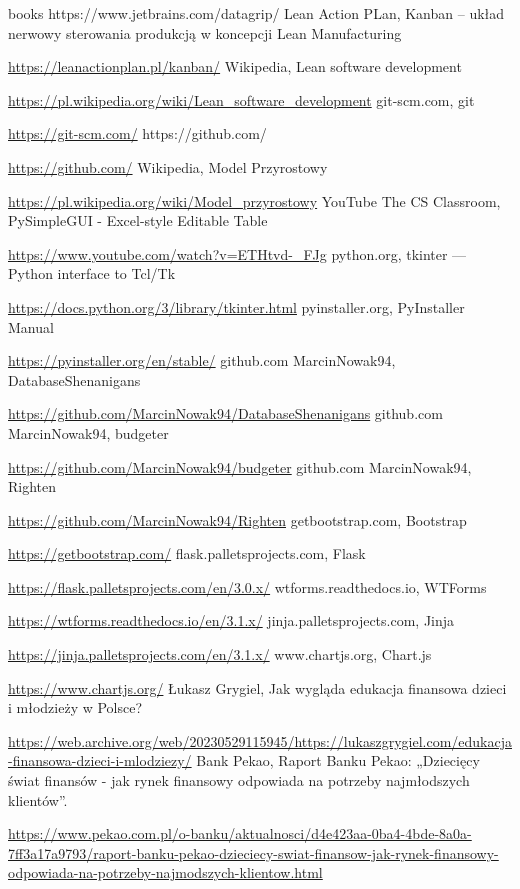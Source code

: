 \documentclass[a4paper,10pt, twoside]{report}
\begin{document}
\begin{thebibliography} {books}
{    https://www.jetbrains.com/datagrip/}
 Lean Action PLan, Kanban – układ nerwowy sterowania produkcją w koncepcji Lean Manufacturing \raggedright\url{
    https://leanactionplan.pl/kanban/}
 Wikipedia, Lean software development \raggedright\url{
    https://pl.wikipedia.org/wiki/Lean_software_development}
 git-scm.com, git \raggedright\url{
    https://git-scm.com/}
 https://github.com/ \raggedright\url{
    https://github.com/}
 Wikipedia, Model Przyrostowy \raggedright\url{
    https://pl.wikipedia.org/wiki/Model_przyrostowy}
 YouTube The CS Classroom, PySimpleGUI - Excel-style Editable Table \raggedright\url{
    https://www.youtube.com/watch?v=ETHtvd-_FJg}
 python.org, tkinter — Python interface to Tcl/Tk \raggedright\url{
    https://docs.python.org/3/library/tkinter.html}
 pyinstaller.org, PyInstaller Manual \raggedright\url{
    https://pyinstaller.org/en/stable/}
 github.com MarcinNowak94, DatabaseShenanigans \raggedright\url{
    https://github.com/MarcinNowak94/DatabaseShenanigans}
 github.com MarcinNowak94, budgeter \raggedright\url{
    https://github.com/MarcinNowak94/budgeter}
 github.com MarcinNowak94, Righten \raggedright\url{
    https://github.com/MarcinNowak94/Righten}
 getbootstrap.com, Bootstrap \raggedright\url{
    https://getbootstrap.com/}
 flask.palletsprojects.com, Flask \raggedright\url{
    https://flask.palletsprojects.com/en/3.0.x/}
 wtforms.readthedocs.io, WTForms \raggedright\url{
    https://wtforms.readthedocs.io/en/3.1.x/}
 jinja.palletsprojects.com, Jinja \raggedright\url{
    https://jinja.palletsprojects.com/en/3.1.x/}
 www.chartjs.org, Chart.js \raggedright\url{
    https://www.chartjs.org/}
 Łukasz Grygiel, Jak wygląda edukacja finansowa dzieci i młodzieży w Polsce? \raggedright\url{
        https://web.archive.org/web/20230529115945/https://lukaszgrygiel.com/edukacja-finansowa-dzieci-i-mlodziezy/}
 Bank Pekao, Raport Banku Pekao: „Dziecięcy świat finansów - jak rynek finansowy odpowiada na potrzeby najmłodszych klientów”. \raggedright\url{
        https://www.pekao.com.pl/o-banku/aktualnosci/d4e423aa-0ba4-4bde-8a0a-7ff3a17a9793/raport-banku-pekao-dzieciecy-swiat-finansow-jak-rynek-finansowy-odpowiada-na-potrzeby-najmodszych-klientow.html}
\end{thebibliography}

\listoffigures
\listoftables
\lstlistoflistings
\end{document}
